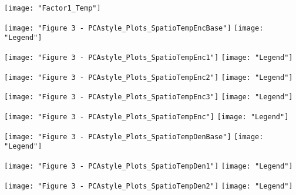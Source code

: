 \documentclass[xcolor=x11names,compress]{beamer}
\renewcommand{\(}{\begin{columns}}
\renewcommand{\)}{\end{columns}}
\newcommand{\<}[1]{\begin{column}{#1}}
\renewcommand{\>}{\end{column}}
\begin{document}
\begin{frame}{}
\centering
\texttt{[image: "Factor1\_Temp"]}
\end{frame}


\begin{frame}{}

\centering
\texttt{[image: "Figure 3 - PCAstyle\_Plots\_SpatioTempEncBase"]}
\texttt{[image: "Legend"]}

\end{frame}

\begin{frame}{}

\texttt{[image: "Figure 3 - PCAstyle\_Plots\_SpatioTempEnc1"]} 
\texttt{[image: "Legend"]}
\end{frame}

\begin{frame}{}
\texttt{[image: "Figure 3 - PCAstyle\_Plots\_SpatioTempEnc2"]}
\texttt{[image: "Legend"]}
\end{frame}


\begin{frame}{}
\centering
\texttt{[image: "Figure 3 - PCAstyle\_Plots\_SpatioTempEnc3"]}
\texttt{[image: "Legend"]}
\end{frame}


\begin{frame}{}
\centering
\texttt{[image: "Figure 3 - PCAstyle\_Plots\_SpatioTempEnc"]}
\texttt{[image: "Legend"]}
\end{frame}

\begin{frame}{}
\centering
\texttt{[image: "Figure 3 - PCAstyle\_Plots\_SpatioTempDenBase"]}
\texttt{[image: "Legend"]}
\end{frame}


\begin{frame}{}
\centering
\texttt{[image: "Figure 3 - PCAstyle\_Plots\_SpatioTempDen1"]}
\texttt{[image: "Legend"]}
\end{frame}

\begin{frame}{}
\centering
\texttt{[image: "Figure 3 - PCAstyle\_Plots\_SpatioTempDen2"]}
\texttt{[image: "Legend"]}
\end{frame}
\end{document}
